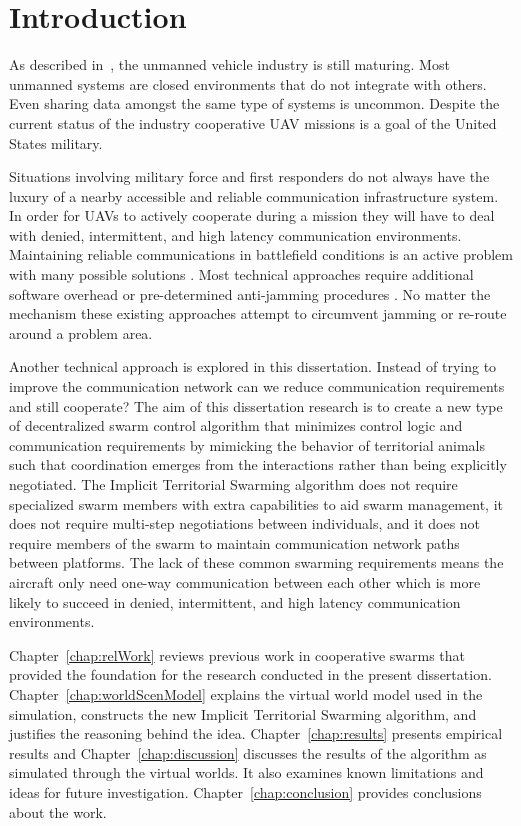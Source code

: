 \chapter{Introduction}
As described in~\textcite{dod_uas_roadmap}, the unmanned vehicle industry is still maturing.  Most unmanned systems are closed environments that do not integrate with others.  Even sharing data amongst the same type of systems is uncommon.  Despite the current status of the industry cooperative UAV missions is a goal of the United States military.

Situations involving military force and first responders do not always have the luxury of a nearby accessible and reliable communication infrastructure system.  In order for UAVs to actively cooperate during a mission they will have to deal with denied, intermittent, and high latency communication environments.  Maintaining reliable communications in battlefield conditions is an active problem with many possible solutions \parencites{tacom_modeling, gapr2_dtn_routing, unmet_wireless_challenges}. Most technical approaches require additional software overhead \parencite{p2p_tac_edge, reliable_tac_com} or pre-determined anti-jamming procedures \parencite{anti_jam_technique}.  No matter the mechanism these existing approaches attempt to circumvent jamming or re-route around a problem area.

Another technical approach is explored in this dissertation.  Instead of trying to improve the communication network can we reduce communication requirements and still cooperate? The aim of this dissertation research is to create a new type of decentralized swarm control algorithm that minimizes control logic and communication requirements by mimicking the behavior of territorial animals such that coordination emerges from the interactions rather than being explicitly negotiated.  The Implicit Territorial Swarming algorithm does not require specialized swarm members with extra capabilities to aid swarm management, it does not require multi-step negotiations between individuals, and it does not require members of the swarm to maintain communication network paths between platforms.  The lack of these common swarming requirements means the aircraft only need one-way communication between each other which is more likely to succeed in denied, intermittent, and high latency communication environments.

Chapter~\ref{chap:relWork} reviews previous work in cooperative swarms that provided the foundation for the research conducted in the present dissertation.  Chapter~\ref{chap:worldScenModel} explains the virtual world model used in the simulation, constructs the new Implicit Territorial Swarming algorithm, and justifies the reasoning behind the idea.  Chapter~\ref{chap:results} presents empirical results and Chapter~\ref{chap:discussion} discusses the results of the algorithm as simulated through the virtual worlds. It also examines known limitations and ideas for future investigation.  Chapter~\ref{chap:conclusion} provides conclusions about the work.


